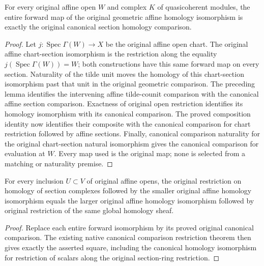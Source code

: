 \begin{theorem}
\label{thm:cartier-geometric-affine-homology-canonical}
\leanok
{}
For every original affine open $W$ and complex $K$ of quasicoherent
modules, the entire forward map of the original geometric affine
homology isomorphism is exactly the original canonical section
homology comparison.
\end{theorem}
\begin{proof}
Let $j:\operatorname{Spec}\Gamma(W)\to X$ be the original affine
open chart. The original affine chart-section isomorphism is the
restriction along the equality $j(\operatorname{Spec}\Gamma(W))=W$;
both constructions have this same forward map on every section.
Naturality of the tilde unit moves the homology of this chart-section
isomorphism past that unit in the original geometric comparison.
The preceding lemma identifies the intervening affine tilde-counit
comparison with the canonical affine section comparison. Exactness
of original open restriction identifies its homology isomorphism
with its canonical comparison. The proved composition identity now
identifies their composite with the canonical comparison for
chart restriction followed by affine sections. Finally, canonical
comparison naturality for the original chart-section natural
isomorphism gives the canonical comparison for evaluation at $W$.
Every map used is the original map; none is selected from a matching
or naturality premise.
\end{proof}

\begin{theorem}
\label{thm:cartier-geometric-affine-homology-restriction}
\leanok
{}
For every inclusion $U\subset V$ of original affine opens, the
original restriction on homology of section complexes followed by
the smaller original affine homology isomorphism equals the larger
original affine homology isomorphism followed by original restriction
of the same global homology sheaf.
\end{theorem}
\begin{proof}
Replace each entire forward isomorphism by its proved original
canonical comparison. The existing native canonical comparison
restriction theorem then gives exactly the asserted square,
including the canonical homology isomorphism for restriction of
scalars along the original section-ring restriction.
\end{proof}
